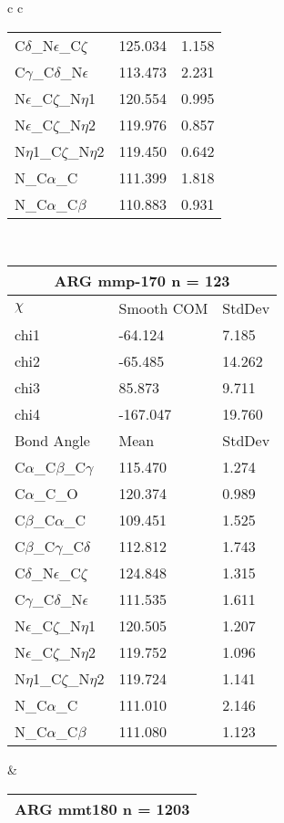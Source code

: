 \begin{longtable}{ c c }
\begin{tabular}{ l l l }
  C$\delta$\_N$\epsilon$\_C$\zeta$ & 125.034 & 1.158\\
  C$\gamma$\_C$\delta$\_N$\epsilon$ & 113.473 & 2.231\\
  N$\epsilon$\_C$\zeta$\_N$\eta$1 & 120.554 & 0.995\\
  N$\epsilon$\_C$\zeta$\_N$\eta$2 & 119.976 & 0.857\\
  N$\eta$1\_C$\zeta$\_N$\eta$2 & 119.450 & 0.642\\
  N\_C$\alpha$\_C & 111.399 & 1.818\\
  N\_C$\alpha$\_C$\beta$ & 110.883 & 0.931\\
  \bottomrule
  \end{tabular}
  \\
  \begin{tabular}{ l l l }
  \toprule
  \multicolumn{3}{c}{ARG \textbf{mmp-170} n = 123} \\ \toprule
  $\chi$       & Smooth COM & StdDev \\ \midrule
  chi1 & -64.124 & 7.185 \\ 
  chi2 & -65.485 & 14.262 \\ 
  chi3 & 85.873 & 9.711 \\ 
  chi4 & -167.047 & 19.760 \\ \midrule
  Bond Angle   & Mean     & StdDev \\ \midrule
  C$\alpha$\_C$\beta$\_C$\gamma$ & 115.470 & 1.274\\
  C$\alpha$\_C\_O & 120.374 & 0.989\\
  C$\beta$\_C$\alpha$\_C & 109.451 & 1.525\\
  C$\beta$\_C$\gamma$\_C$\delta$ & 112.812 & 1.743\\
  C$\delta$\_N$\epsilon$\_C$\zeta$ & 124.848 & 1.315\\
  C$\gamma$\_C$\delta$\_N$\epsilon$ & 111.535 & 1.611\\
  N$\epsilon$\_C$\zeta$\_N$\eta$1 & 120.505 & 1.207\\
  N$\epsilon$\_C$\zeta$\_N$\eta$2 & 119.752 & 1.096\\
  N$\eta$1\_C$\zeta$\_N$\eta$2 & 119.724 & 1.141\\
  N\_C$\alpha$\_C & 111.010 & 2.146\\
  N\_C$\alpha$\_C$\beta$ & 111.080 & 1.123\\
  \bottomrule
  \end{tabular}
  &
  \begin{tabular}{ l l l }
  \toprule
  \multicolumn{3}{c}{ARG \textbf{mmt180} n = 1203} \\ \toprule

\end{tabular}
\end{longtable}
